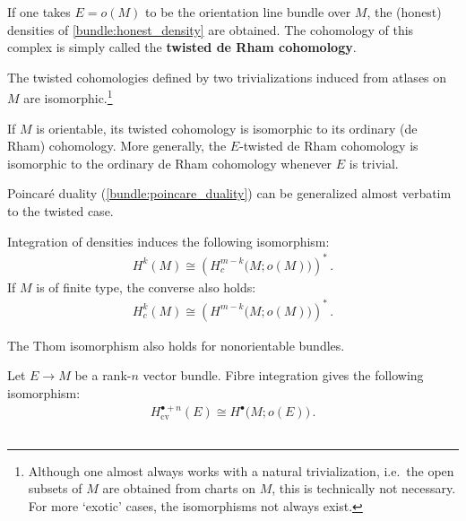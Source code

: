    If one takes $E=o(M)$ to be the orientation line bundle over $M$, the (honest) densities of \cref{bundle:honest_density} are obtained. The cohomology of this complex is simply called the \textbf{twisted de Rham cohomology}.
    \begin{property}[Isomorphism]
        The twisted cohomologies defined by two trivializations induced from atlases on $M$ are isomorphic.\footnote{Although one almost always works with a natural trivialization, i.e.~the open subsets of $M$ are obtained from charts on $M$, this is technically not necessary. For more `exotic' cases, the isomorphisms not always exist.}
    \end{property}
    \begin{property}
        If $M$ is orientable, its twisted cohomology is isomorphic to its ordinary (de Rham) cohomology. More generally, the $E$-twisted de Rham cohomology is isomorphic to the ordinary de Rham cohomology whenever $E$ is trivial.
    \end{property}

    Poincar\'e duality (\cref{bundle:poincare_duality}) can be generalized almost verbatim to the twisted case.
    \begin{theorem}
        Integration of densities induces the following isomorphism:
        \begin{gather}
            H^k(M)\cong\left(H^{m-k}_c\bigl(M;o(M)\bigr)\right)^*\,.
        \end{gather}
        If $M$ is of finite type, the converse also holds:
        \begin{gather}
            H^k_c(M)\cong\left(H^{m-k}\bigl(M;o(M)\bigr)\right)^*\,.
        \end{gather}
    \end{theorem}
    The Thom isomorphism also holds for nonorientable bundles.
    \begin{theorem}
        Let $E\rightarrow M$ be a rank-$n$ vector bundle. Fibre integration gives the following isomorphism:
        \begin{gather}
            H^{\bullet+n}_{\text{cv}}(E)\cong H^\bullet\bigl(M;o(E)\bigr)\,.
        \end{gather}
    \end{theorem}

\subsection{}

